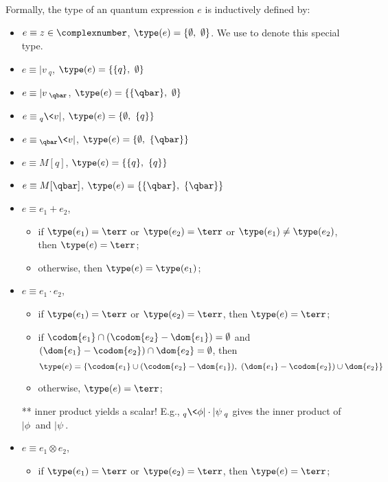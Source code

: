 \begin{definition}
    Formally, the type of an quantum expression $e$ is inductively defined by:
    \begin{itemize}
        \item $e\equiv z\in \complexnumber$, $\type(e) = \{\emptyset,\ \emptyset\}$. We use \scalar to denote this special type.
        \item $e\equiv |v\>_q$, $\type(e) = \{\{q\},\ \emptyset\}$
        \item $e\equiv |v\>_{\qbar}$, $\type(e) = \{\{\qbar\},\ \emptyset\}$
        \item $e\equiv {}_q\<v|$, $\type(e) = \{\emptyset,\  \{q\}\}$
        \item $e\equiv {}_{\qbar}\<v|$, $\type(e) = \{\emptyset,\ \{\qbar\}\}$
        \item $e\equiv M[q]$, $\type(e) = \{\{q\},\  \{q\}\}$
        \item $e\equiv M[\qbar]$, $\type(e) = \{\{\qbar\},\ \{\qbar\}\}$
        \item $e\equiv e_1+e_2$, 
        \begin{itemize}
            \item if $\type(e_1) = \terr$ or $\type(e_2) = \terr$ or $\type(e_1) \neq \type(e_2)$, then $\type(e) = \terr$;
            \item otherwise, then $\type(e) = \type(e_1)$;
        \end{itemize}
        \item $e\equiv e_1\cdot e_2$, 
        \begin{itemize}
            \item if $\type(e_1) = \terr$ or $\type(e_2) = \terr$, then $\type(e) = \terr$;
            \item if $\codom{e_1}\cap(\codom{e_2}-\dom{e_1}) = \emptyset$ and $(\dom{e_1}-\codom{e_2})\cap \dom{e_2} = \emptyset$, then 
                $$\type(e) = \{\codom{e_1}\cup(\codom{e_2}-\dom{e_1}),\  (\dom{e_1}-\codom{e_2})\cup \dom{e_2}\}$$
            \item otherwise, $\type(e) = \terr$;
        \end{itemize}
        ** inner product yields a scalar! E.g., ${}_q\<\phi|\cdot|\psi\>_{q}$ gives the inner product of $|\phi\>$ and $|\psi\>$.
        \item $e\equiv e_1\otimes e_2$, 
        \begin{itemize}
            \item if $\type(e_1) = \terr$ or $\type(e_2) = \terr$, then $\type(e) = \terr$;

\end{itemize}
\end{itemize}
\end{definition}
